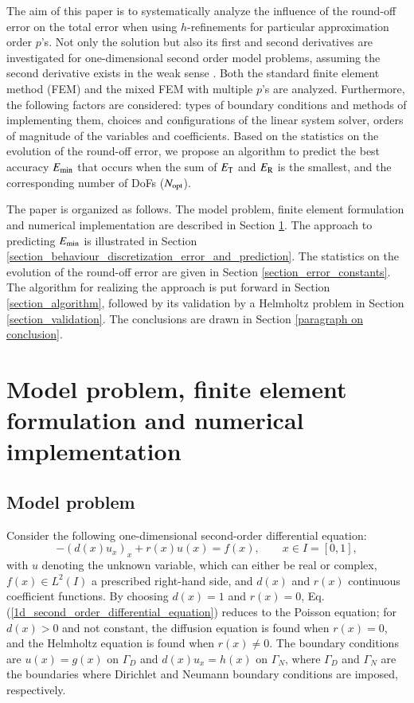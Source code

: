 \documentclass[review,3p]{elsarticle}
\newcommand{\apostrophe}[1]{\rq{#1}}			%
\begin{document}
The aim of this paper is to systematically analyze the influence of the round-off error on the total error when using $h$-refinements for particular approximation order $p$\apostrophe s. Not only the solution but also its first and second derivatives are investigated for one-dimensional second order model problems, assuming the second derivative exists in the weak sense \cite{necas2011direct}. Both the standard finite element method (FEM) and the mixed FEM \cite{boffi2013mixed} with multiple $p$\apostrophe s are analyzed. Furthermore, the following factors are considered: types of boundary conditions and methods of implementing them, choices and configurations of the linear system solver, orders of magnitude of the variables and coefficients. Based on the statistics on the evolution of the round-off error, we propose an algorithm to predict the best accuracy $E_{\rm min}$ that occurs when the sum of $E_{\rm T}$ and $E_{\rm R}$ is the smallest, and the corresponding number of DoFs ($N_{\rm opt}$).

The paper is organized as follows. The model problem, finite element formulation and numerical implementation are described in Section \ref{section_model_problem_FEM_formulation_numerical_implementation}. The approach to predicting ${E}_{\rm {min}}$ is illustrated in Section \ref{section_behaviour_discretization_error_and_prediction}. The statistics on the evolution of the round-off error are given in Section \ref{section_error_constants}. The algorithm for realizing the approach is put forward in Section \ref{section_algorithm}, followed by its validation by a Helmholtz problem in Section \ref{section_validation}. The conclusions are drawn in Section \ref{paragraph on conclusion}.


\section{Model problem, finite element formulation and numerical implementation}	\label{section_model_problem_FEM_formulation_numerical_implementation}

\subsection{Model problem}

Consider the following one-dimensional second-order differential equation:
\begin{equation}
  -\left(d(x) u_x \right)_x + r(x)u(x) = f(x),\qquad x \in I = [0,1],	\label{1d_second_order_differential_equation}
\end{equation}
with $u$ denoting the unknown variable, which can either be real or complex, $f(x) \in L^2 (I)$ a prescribed right-hand side, and $d(x)$ and $r(x)$ continuous coefficient functions.
By choosing $d(x)=1$ and $r(x)=0$, Eq. (\ref{1d_second_order_differential_equation}) reduces to the Poisson equation; for $d(x)>0$ and not constant, the diffusion equation is found when $r(x)=0$, and the Helmholtz equation \citep{haberman2012applied} is found when $r(x) \neq 0$. 
The boundary conditions are $u(x)=g(x)$ on $\Gamma_D$ and $d(x)u_x=h(x)$ on $\Gamma_N$, where $\Gamma_D$ and $\Gamma_N$ are the boundaries where Dirichlet and Neumann boundary conditions are imposed, respectively.
\end{document}
